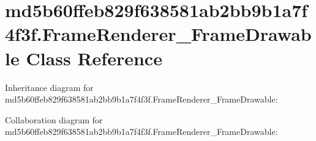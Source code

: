 \hypertarget{classmd5b60ffeb829f638581ab2bb9b1a7f4f3f_1_1_frame_renderer___frame_drawable}{}\section{md5b60ffeb829f638581ab2bb9b1a7f4f3f.\+Frame\+Renderer\+\_\+\+Frame\+Drawable Class Reference}
\label{classmd5b60ffeb829f638581ab2bb9b1a7f4f3f_1_1_frame_renderer___frame_drawable}


Inheritance diagram for md5b60ffeb829f638581ab2bb9b1a7f4f3f.\+Frame\+Renderer\+\_\+\+Frame\+Drawable\+:


Collaboration diagram for md5b60ffeb829f638581ab2bb9b1a7f4f3f.\+Frame\+Renderer\+\_\+\+Frame\+Drawable\+:
